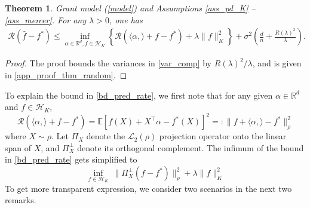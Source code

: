 \documentclass[11pt,twoside]{article}
\newtheorem{theorem}{Theorem}
\def\RR{\mathbb{R}}
\def\EE{\mathbb{E}}
\def\cH{\mathcal H}
\def\cR{\mathcal R}
\def\cL{\mathcal L}
\def\wh{\widehat}
\def\T{\top}
\def\l{\left}
\def\r{\right}
\begin{document}
\begin{theorem}\label{thm_random}
Grant model (\ref{model}) and
Assumptions  \ref{ass_pd_K} -- \ref{ass_mercer}. For any $\lambda >0$, one has
\begin{align}\label{bd_pred_rate}
 \cR(\wh f-f^*) \le   \inf_{\alpha \in \RR^d, f\in \cH_K}\left\{  \cR\l(\langle \alpha,\rangle + f-f^*\r) +  \lambda \|f\|_K^2  \right\}+  \sigma^2   \left(  \frac{d}{n}+\frac{R(\lambda)^2}{\lambda}  \right).
\end{align}   
\end{theorem}
\begin{proof}
    The proof bounds the variances in \eqref{var_comp} by $R(\lambda)^2 /\lambda$, and is given in \cref{app_proof_thm_random}.
\end{proof}

To explain the bound in \eqref{bd_pred_rate}, we first note that  for any given $\alpha\in\RR^d$ and $f\in\cH_K$,
\[
    \cR\l(\langle \alpha,\rangle + f-f^*\r) = \EE[f(X)+X^\T \alpha - f^*(X)]^2  =: \|f + \langle \alpha, \rangle - f^*\|_\rho^2
\]
where $X \sim \rho$. Let $\Pi_X$ denote the $\cL_2(\rho)$ projection operator onto the linear span of $X$, and $\Pi_X^\perp$ denote its orthogonal complement. The infimum of the bound in \eqref{bd_pred_rate} gets simplified to 
\[
    \inf_{f\in\cH_K}  ~  \|\Pi_X^\perp (f -f^*)\|_\rho^2 + \lambda \|f\|_K^2 
\]
To get more transparent expression, we consider two scenarios in the next two remarks.  
\end{document}
